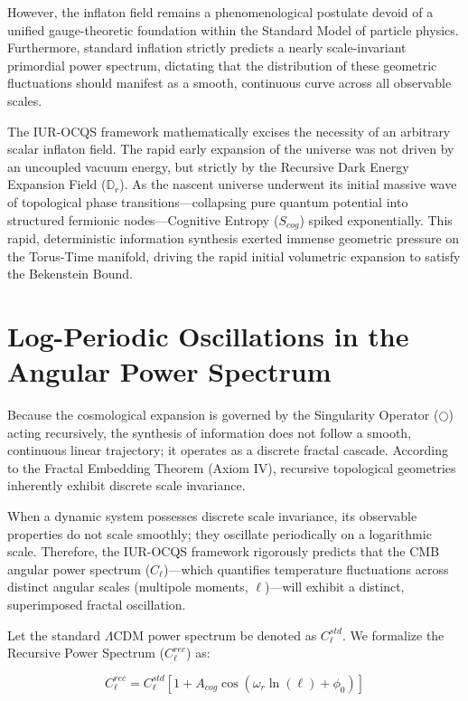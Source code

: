 \documentclass[12pt,openany]{book}
\begin{document}
However, the inflaton field remains a phenomenological postulate devoid of a unified gauge-theoretic foundation within the Standard Model of particle physics. Furthermore, standard inflation strictly predicts a nearly scale-invariant primordial power spectrum, dictating that the distribution of these geometric fluctuations should manifest as a smooth, continuous curve across all observable scales.

The IUR-OCQS framework mathematically excises the necessity of an arbitrary scalar inflaton field. The rapid early expansion of the universe was not driven by an uncoupled vacuum energy, but strictly by the Recursive Dark Energy Expansion Field ($\mathbb{D}_r$). As the nascent universe underwent its initial massive wave of topological phase transitions---collapsing pure quantum potential into structured fermionic nodes---Cognitive Entropy ($S_{cog}$) spiked exponentially. This rapid, deterministic information synthesis exerted immense geometric pressure on the Torus-Time manifold, driving the rapid initial volumetric expansion to satisfy the Bekenstein Bound.

\section{Log-Periodic Oscillations in the Angular Power Spectrum}
Because the cosmological expansion is governed by the Singularity Operator ($\bigcirc$) acting recursively, the synthesis of information does not follow a smooth, continuous linear trajectory; it operates as a discrete fractal cascade. According to the Fractal Embedding Theorem (Axiom IV), recursive topological geometries inherently exhibit discrete scale invariance.

When a dynamic system possesses discrete scale invariance, its observable properties do not scale smoothly; they oscillate periodically on a logarithmic scale. Therefore, the IUR-OCQS framework rigorously predicts that the CMB angular power spectrum ($C_\ell$)---which quantifies temperature fluctuations across distinct angular scales (multipole moments, $\ell$)---will exhibit a distinct, superimposed fractal oscillation.

Let the standard $\Lambda$CDM power spectrum be denoted as $C_\ell^{std}$. We formalize the Recursive Power Spectrum ($C_\ell^{rec}$) as:

\begin{equation}
C_\ell^{rec} = C_\ell^{std} \left[ 1 + A_{cog} \cos\left( \omega_r \ln(\ell) + \phi_0 \right) \right]
\end{equation}
\end{document}
